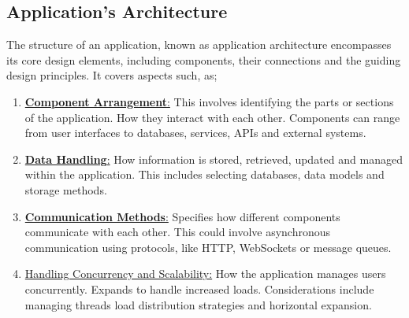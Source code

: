 \subsection{Application's Architecture}
The structure of an application, known as application architecture encompasses its core design elements, including components, their connections and the guiding design principles. It covers aspects such, as;
\begin{enumerate}
    \item  \underline{\textbf{Component Arrangement}:}
 This involves identifying the parts or sections of the application. How they interact with each other. Components can range from user interfaces to databases, services, APIs and external systems.

\item  \underline{\textbf{Data Handling}:} How information is stored, retrieved, updated and managed within the application. This includes selecting databases, data models and storage methods.

\item  \underline{\textbf{Communication Methods}:} Specifies how different components communicate with each other. This could involve asynchronous communication using protocols, like HTTP, WebSockets or message queues.

\item  \underline{Handling Concurrency and Scalability:} How the application manages users concurrently. Expands to handle increased loads. Considerations include managing threads load distribution strategies and horizontal expansion.
\end{enumerate}
